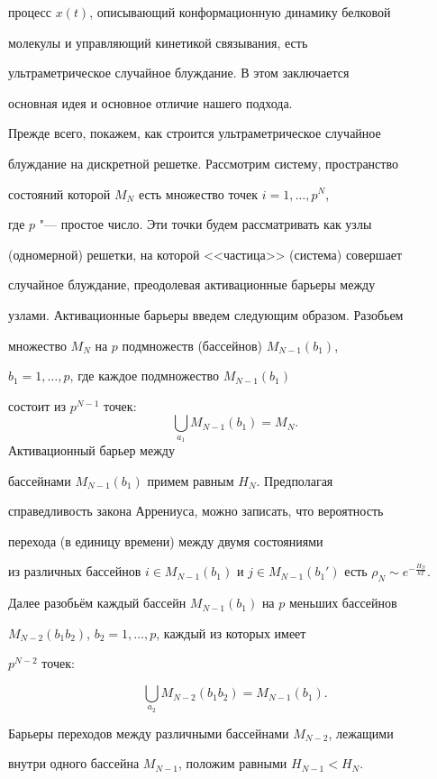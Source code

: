 процесс $x(t)$, описывающий конформационную динамику белковой

молекулы и управляющий кинетикой связывания, есть

ультраметрическое случайное блуждание.   В этом заключается

основная идея и основное отличие нашего подхода.



Прежде всего, покажем, как строится ультраметрическое случайное

блуждание на дискретной решетке. Рассмотрим систему, пространство

состояний которой $M_{N}$ есть множество точек $i=1,\ldots,p^{N}$,

где $p$ "--- простое число. Эти точки будем рассматривать как узлы

(одномерной) решетки, на которой <<частица>> (система) совершает

случайное блуждание, преодолевая  активационные барьеры между

узлами. Активационные барьеры введем следующим образом. Разобьем

множество $M_{N}$ на $p$ подмножеств (бассейнов) $M_{N-1}(b_{1})$,

$b_{1}=1,\ldots,p$, где каждое подмножество $M_{N-1}(b_{1})$

состоит из $p^{N-1}$ точек: $$\bigcup\limits

_{a_{1}}M_{N-1}(b_{1})=M_{N}.$$ Активационный барьер между

бассейнами $M_{N-1}(b_{1})$ примем равным $H_{N}$. Предполагая

справедливость закона Аррениуса, можно записать, что  вероятность

перехода (в единицу времени) между двумя состояниями

 из различных бассейнов $i\in M_{N-1}(b_{1})$ и $j\in M_{N-1}(b_{1}')$ есть $\rho_{N}\sim e^{-\frac{H_{N}}{kT}}$. 

Далее разобьём каждый бассейн $M_{N-1}(b_{1})$ на $p$ меньших бассейнов

$M_{N-2}(b_{1}b_{2})$, $b_{2}=1,\ldots,p$, каждый из которых имеет

$p^{N-2}$ точек:

$$

\bigcup\limits _{a_{2}}M_{N-2}(b_{1}b_{2})=M_{N-1}(b_{1}). $$

Барьеры переходов между различными бассейнами $M_{N-2}$, лежащими

внутри одного бассейна $M_{N-1}$, положим равными $H_{N-1}<H_{N}$.

